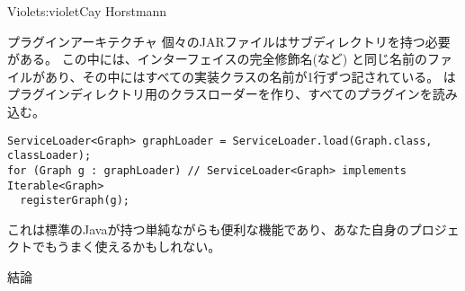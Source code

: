 \begin{aosachapter}{Violet}{s:violet}{Cay Horstmann}
\begin{aosasect1}{プラグインアーキテクチャ}
個々のJARファイルはサブディレクトリを持つ必要がある。
この中には、インターフェイスの完全修飾名(など)
と同じ名前のファイルがあり、その中にはすべての実装クラスの名前が1行ずつ記されている。
はプラグインディレクトリ用のクラスローダーを作り、すべてのプラグインを読み込む。

\begin{verbatim}
ServiceLoader<Graph> graphLoader = ServiceLoader.load(Graph.class, classLoader);
for (Graph g : graphLoader) // ServiceLoader<Graph> implements Iterable<Graph>
  registerGraph(g); 
\end{verbatim}

これは標準のJavaが持つ単純ながらも便利な機能であり、あなた自身のプロジェクトでもうまく使えるかもしれない。

\end{aosasect1}

\begin{aosasect1}{結論}


\end{aosasect1}
\end{aosachapter}
